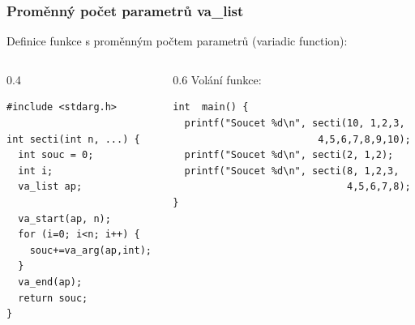 \documentclass{beamer}
\begin{document}
\begin{frame}[fragile]
\frametitle{Proměnný počet parametrů va\_list}

Definice funkce s proměnným počtem parametrů (variadic function):

\begin{columns}
\begin{column}{0.4\textwidth}
\begin{verbatim}
#include <stdarg.h>

int secti(int n, ...) {
  int souc = 0;
  int i;
  va_list ap;
  
  va_start(ap, n);
  for (i=0; i<n; i++) {
    souc+=va_arg(ap,int);
  }
  va_end(ap);
  return souc;
}
\end{verbatim}
\end{column}   
\begin{column}{0.6\textwidth}
Volání funkce:

\begin{verbatim}
int  main() {
  printf("Soucet %d\n", secti(10, 1,2,3,
                         4,5,6,7,8,9,10);
  printf("Soucet %d\n", secti(2, 1,2);
  printf("Soucet %d\n", secti(8, 1,2,3,
                              4,5,6,7,8);
}
\end{verbatim}
\end{column}
\end{columns}

\end{frame}
\end{document}
